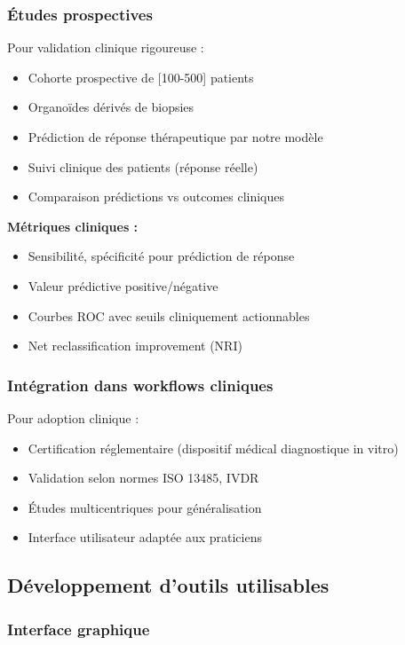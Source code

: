 \subsubsection{Études prospectives}

Pour validation clinique rigoureuse :
\begin{itemize}
    \item Cohorte prospective de [100-500] patients
    \item Organoïdes dérivés de biopsies
    \item Prédiction de réponse thérapeutique par notre modèle
    \item Suivi clinique des patients (réponse réelle)
    \item Comparaison prédictions vs outcomes cliniques
\end{itemize}

\textbf{Métriques cliniques :}
\begin{itemize}
    \item Sensibilité, spécificité pour prédiction de réponse
    \item Valeur prédictive positive/négative
    \item Courbes ROC avec seuils cliniquement actionnables
    \item Net reclassification improvement (NRI)
\end{itemize}

\subsubsection{Intégration dans workflows cliniques}

Pour adoption clinique :
\begin{itemize}
    \item Certification réglementaire (dispositif médical diagnostique in vitro)
    \item Validation selon normes ISO 13485, IVDR
    \item Études multicentriques pour généralisation
    \item Interface utilisateur adaptée aux praticiens
\end{itemize}

\subsection{Développement d'outils utilisables}

\subsubsection{Interface graphique}

